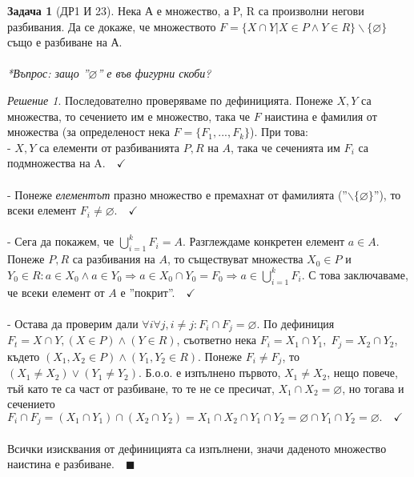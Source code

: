 \documentclass[10pt, a4paper]{article}
\theoremstyle{definition}
\newtheorem{problem}{Задача}
\theoremstyle{remark}
\newtheorem*{sol}{Решение}
\begin{document}
\hfill
\begin{problem}[ДР1 И 23]
    Нека А е множество, а P, R са произволни негови разбивания. Да се докаже, че множеството \(F=\{X\cap Y| X\in P\wedge Y\in R\}\backslash\{\varnothing\}\) също е разбиване на А.\\
    \\\emph{*Въпрос: защо ''$\varnothing$'' е във фигурни скоби?}
\end{problem}
\begin{sol}
    Последователно проверяваме по дефиницията.
    Понеже \(X,Y\) са множества, то сечението им е множество, така че \(F\) наистина е фамилия от множества (за определеност нека $F=\{F_1,...,F_k\}$). При това:\\
    - \(X,Y\) са елементи от разбиванията \(P,R\) на $A$, така че сеченията им \(F_i\) са подмножества на A.$\quad\checkmark$\\
    \\- Понеже \emph{елементът} празно множество е премахнат от фамилията (''$\backslash\{\varnothing\}$''), то всеки елемент $F_i\neq\varnothing.\quad\checkmark$\\
    \\- Сега да покажем, че $\bigcup_{i=1}^k F_i=A$. Разглеждаме конкретен елемент $a\in A$. Понеже $P, R$ са разбивания на $A$, то съществуват множества $X_0\in P$ и $Y_0\in R: a\in X_0 \wedge a\in Y_0\Rightarrow a\in X_0\cap Y_0=F_0 \Rightarrow a\in\bigcup_{i=1}^k F_i$. С това заключаваме, че всеки елемент от \(A\) е ''покрит''.$\quad\checkmark$\\
    \\- Остава да проверим дали $\forall i\forall j, i\neq j: F_i\cap F_j=\varnothing$. По дефиниция $F_t=X\cap Y, (X\in P)\wedge (Y\in R)$, съответно нека  $F_i=X_1\cap Y_1,\;F_j=X_2\cap Y_2$, където $(X_1,X_2\in P)\wedge (Y_1,Y_2\in R)$. Понеже \(F_i\neq F_j\), то $(X_1\neq X_2)\vee (Y_1\neq Y_2)$. Б.о.о. е  изпълнено първото, \(X_1\neq X_2\), нещо повече, тъй като те са част от разбиване, то те не се пресичат, $X_1\cap X_2=\varnothing$, но тогава и сечението $F_i\cap F_j = (X_1\cap Y_1)\cap(X_2\cap Y_2)=X_1\cap X_2\cap Y_1\cap Y_2 = \varnothing\cap Y_1\cap Y_2=\varnothing.\quad\checkmark$\\
    \\Всички изисквания от дефиницията са изпълнени, значи даденото множество наистина е разбиване.$\quad\blacksquare$
\end{sol}
\end{document}
